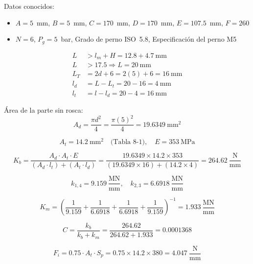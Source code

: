 \documentclass[11pt,tesis,twoside,openright,spanish]{upiiztt}
\begin{document}
Datos conocidos:
\begin{itemize}
  \item $A = 5$~mm, $B = 5$~mm, $C = 170$~mm, $D = 170$~mm, $E = 107.5$~mm, $F = 260$
  \item $N = 6$, $P_g = 5$~bar, Grado de perno ISO~5.8, Especificación del perno M5
\end{itemize}

\begin{align}
L &> l_m + H = 12.8 + 4.7\ \text{mm} \\
L &> 17.5 \Rightarrow L = 20\ \text{mm} \\
L_T &= 2d + 6 = 2(5) + 6 = 16\ \text{mm} \\
l_d &= L - L_t = 20 - 16 = 4\ \text{mm} \\
l_t &= l - l_d = 20 - 4 = 16\ \text{mm}
\end{align}

Área de la parte sin rosca:
\begin{equation}
A_d = \frac{\pi d^2}{4} = \frac{\pi(5)^2}{4} = 19.6349\ \text{mm}^2
\end{equation}

\begin{equation}
A_t = 14.2\ \text{mm}^2 \quad \text{(Tabla 8-1)}, \quad E = 353\ \text{MPa}
\end{equation}

\begin{equation}
K_b = \frac{A_d \cdot A_t \cdot E}{(A_d \cdot l_t) + (A_t \cdot l_d)} = \frac{19.6349 \times 14.2 \times 353}{(19.6349 \times 16) + (14.2 \times 4)} = 264.62\ \frac{\text{N}}{\text{mm}}
\end{equation}

\begin{equation}
k_{1,4} = 9.159\ \frac{\text{MN}}{\text{mm}}, \quad k_{2,3} = 6.6918\ \frac{\text{MN}}{\text{mm}}
\end{equation}

\begin{equation}
K_m = \left(\frac{1}{9.159} + \frac{1}{6.6918} + \frac{1}{6.6918} + \frac{1}{9.159}\right)^{-1} = 1.933\ \frac{\text{MN}}{\text{mm}}
\end{equation}

\begin{equation}
C = \frac{k_b}{k_b + k_m} = \frac{264.62}{264.62 + 1.933} = 0.0001368
\end{equation}

\begin{equation}
F_i = 0.75 \cdot A_t \cdot S_p = 0.75 \times 14.2 \times 380 = 4.047\ \frac{\text{N}}{\text{mm}}
\end{equation}
\end{document}
